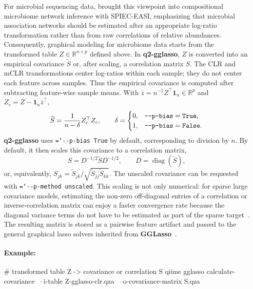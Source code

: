 \documentclass[11pt,a4paper]{article}
\newcommand{\code}[1]{\allowbreak\texttt{\hyphenchar\font=`\-\relax #1}}
\newcommand{\pkg}[1]{\textbf{#1}}
\newcommand{\R}{\mathbb{R}}
\newcommand{\one}{\mathbf{1}}
\begin{document}
For microbial sequencing data, \citet{kurtz2015sparse} brought this viewpoint
into compositional microbiome network inference with SPIEC-EASI, emphasizing
that microbial association networks should be estimated after an appropriate
log-ratio transformation rather than from raw correlations of relative
abundances. Consequently, graphical modeling for microbiome data 
starts from the transformed table $Z\in\R^{n\times p}$ defined above. 
In \pkg{q2-gglasso}, $Z$ is converted into an empirical covariance
$\widetilde{S}$ or, after scaling, a correlation matrix $S$. The CLR and mCLR
transformations center log-ratios within each sample; they do not center each
feature across samples. Thus the empirical covariance is computed after
subtracting feature-wise sample means. With
$\bar z = n^{-1}Z^\top\one_n \in \R^p$ and
$Z_c = Z-\one_n\bar z^\top$,
\begin{equation}
\label{eq:covariance}
\widetilde{S} =
\frac{1}{n-\delta} Z_c^\top Z_c,
\qquad
\delta =
\begin{cases}
0, & \code{-{}-p-bias}=\code{True},\\
1, & \code{-{}-p-bias}=\code{False}.
\end{cases}
\end{equation}
\pkg{q2-gglasso} uses \code{-{}-p-bias True} by default, corresponding to
division by $n$. By default, it then scales this covariance to a correlation
matrix,
\begin{equation}
\label{eq:cov_scaling}
S = D^{-1/2} \widetilde{S} D^{-1/2},
\qquad
D = \operatorname{diag}(\widetilde{S}),
\end{equation}
or, equivalently, $S_{jk}=\widetilde{S}_{jk}/
\sqrt{\widetilde{S}_{jj}\widetilde{S}_{kk}}$. The unscaled covariance can be
requested with \code{-{}-p-method unscaled}. This scaling is not only numerical:
for sparse large covariance models, estimating the non-zero off-diagonal entries
of a correlation or inverse-correlation matrix can enjoy a faster convergence
rate because the diagonal variance terms do not have to be estimated as part of
the sparse target~\citep{lam2009sparsistency}. The resulting matrix is stored as
a pairwise feature artifact and passed to the general graphical lasso solvers
inherited from \pkg{GGLasso}~\citep{Schaipp2021}.

\paragraph{Example:} \mbox{}
\begin{PseudoCode}
# transformed table Z -> covariance or correlation S
qiime gglasso calculate-covariance \
    --i-table Z-gglasso-clr.qza \
    --o-covariance-matrix S.qza
\end{PseudoCode}
\end{document}
